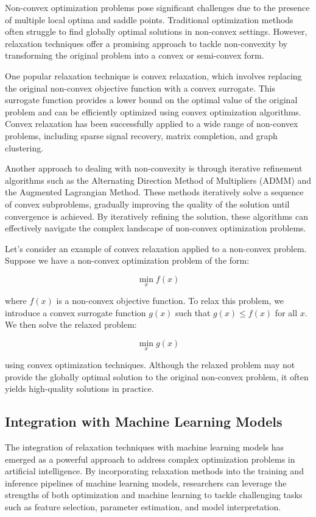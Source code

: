 \documentclass[12pt]{book} %
\begin{document}
Non-convex optimization problems pose significant challenges due to the presence of multiple local optima and saddle points. Traditional optimization methods often struggle to find globally optimal solutions in non-convex settings. However, relaxation techniques offer a promising approach to tackle non-convexity by transforming the original problem into a convex or semi-convex form.

One popular relaxation technique is convex relaxation, which involves replacing the original non-convex objective function with a convex surrogate. This surrogate function provides a lower bound on the optimal value of the original problem and can be efficiently optimized using convex optimization algorithms. Convex relaxation has been successfully applied to a wide range of non-convex problems, including sparse signal recovery, matrix completion, and graph clustering.

Another approach to dealing with non-convexity is through iterative refinement algorithms such as the Alternating Direction Method of Multipliers (ADMM) and the Augmented Lagrangian Method. These methods iteratively solve a sequence of convex subproblems, gradually improving the quality of the solution until convergence is achieved. By iteratively refining the solution, these algorithms can effectively navigate the complex landscape of non-convex optimization problems.

Let's consider an example of convex relaxation applied to a non-convex problem. Suppose we have a non-convex optimization problem of the form:

\[
\min_{x} f(x)
\]

where \(f(x)\) is a non-convex objective function. To relax this problem, we introduce a convex surrogate function \(g(x)\) such that \(g(x) \leq f(x)\) for all \(x\). We then solve the relaxed problem:

\[
\min_{x} g(x)
\]

using convex optimization techniques. Although the relaxed problem may not provide the globally optimal solution to the original non-convex problem, it often yields high-quality solutions in practice.

\subsection{Integration with Machine Learning Models}

The integration of relaxation techniques with machine learning models has emerged as a powerful approach to address complex optimization problems in artificial intelligence. By incorporating relaxation methods into the training and inference pipelines of machine learning models, researchers can leverage the strengths of both optimization and machine learning to tackle challenging tasks such as feature selection, parameter estimation, and model interpretation.
\end{document}
